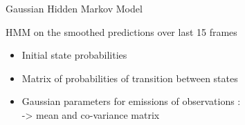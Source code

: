 \begin{frame}{Gaussian Hidden Markov Model}
	
	\begin{block}{HMM on the smoothed predictions over last 15 frames}
		\vspace{-.2cm}
	\begin{itemize}
		\item Initial state probabilities
		\item Matrix of probabilities of transition between states 
		\item Gaussian parameters for emissions of observations : \\
		\hspace{4cm} -> mean and co-variance matrix
	\end{itemize}
	\end{block}	
	

\end{frame}
